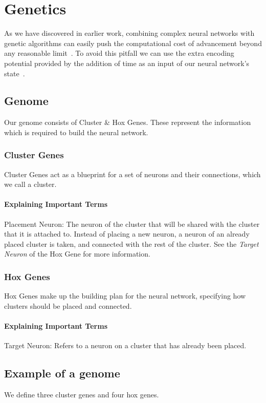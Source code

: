 \section{Genetics}

As we have discovered in earlier work, combining complex neural networks 
with genetic algorithms can easily push the computational cost of advancement
beyond any reasonable limit~\cite{Ferner2017}.
To avoid this pitfall we can use the extra encoding potential provided by 
the addition of time as an input of our neural network's state~\cite{Paugam-Moisy2012}.

\subsection{Genome}
Our genome consists of Cluster \& Hox Genes.
These represent the information which is required to build the neural network.

\subsubsection{Cluster Genes}
Cluster Genes act as a blueprint for a set of neurons and their connections, which we call a cluster.

\paragraph{Explaining Important Terms}
Placement Neuron: The neuron of the cluster that will be shared with the cluster that it is attached to. Instead of placing a new neuron, a neuron of an already placed cluster is taken, and connected with the rest of the cluster. See the \emph{Target Neuron} of the Hox Gene for more information.

\subsubsection{Hox Genes}
Hox Genes make up the building plan for the neural network,
specifying how clusters should be placed and connected.

\paragraph{Explaining Important Terms}
Target Neuron: Refers to a neuron on a cluster that has already been placed.

\newpage

\label{Example of a genome}
\subsection{Example of a genome}
We define three cluster genes and four hox genes.

